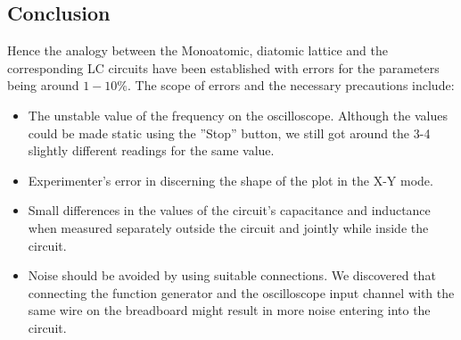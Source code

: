 	\subsection{Conclusion}
		Hence the analogy between the Monoatomic, diatomic lattice and the corresponding LC circuits have been established with errors for the parameters being around $1 - 10\%$. The scope of errors and the necessary precautions include:

		\begin{itemize}
			\item The unstable value of the frequency on the oscilloscope. Although the values could be made static using the ”Stop” button, we still got around the 3-4 slightly different readings for the same value.
			\item Experimenter's error in discerning the shape of the plot in the X-Y mode.
			\item Small differences in the values of the circuit's capacitance and inductance when measured separately outside the circuit and jointly while inside the circuit.
			\item Noise should be avoided by using suitable connections. We discovered that connecting the function generator and the oscilloscope input channel with the same wire on the breadboard might result in more noise entering into the circuit.
		\end{itemize}

	